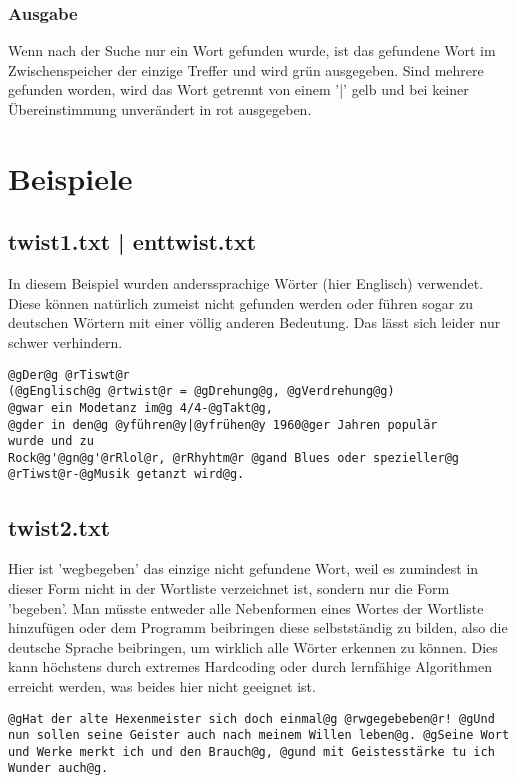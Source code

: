 \documentclass[a4paper,10pt,ngerman]{scrartcl}
\newcommand{\newsection}{\vspace{3\baselineskip}\section}
\newcommand{\newsubsubsection}{\vspace{1\baselineskip}\subsubsection}
\begin{document}
\newsubsubsection{Ausgabe}
Wenn nach der Suche nur ein Wort gefunden wurde, ist das gefundene Wort im Zwischenspeicher der einzige Treffer und wird grün ausgegeben. Sind mehrere gefunden worden, wird das Wort getrennt von einem '|' gelb und bei keiner Übereinstimmung unverändert in rot ausgegeben.



\pagebreak
\newsection{Beispiele}


\vspace{1\baselineskip}
\subsection[twist1.txt]{twist1.txt | enttwist.txt}
In diesem Beispiel wurden anderssprachige Wörter (hier Englisch) verwendet. Diese können natürlich zumeist nicht gefunden werden oder führen sogar zu deutschen Wörtern mit einer völlig anderen Bedeutung. Das lässt sich leider nur schwer verhindern.

\begin{lstlisting}
@gDer@g @rTiswt@r
(@gEnglisch@g @rtwist@r = @gDrehung@g, @gVerdrehung@g)
@gwar ein Modetanz im@g 4/4-@gTakt@g,
@gder in den@g @yführen@y|@yfrühen@y 1960@ger Jahren populär
wurde und zu
Rock@g'@gn@g'@rRlol@r, @rRhyhtm@r @gand Blues oder spezieller@g
@rTiwst@r-@gMusik getanzt wird@g.
\end{lstlisting}

\vspace{1\baselineskip}
\subsection{twist2.txt}
Hier ist 'wegbegeben' das einzige nicht gefundene Wort, weil es zumindest in dieser Form nicht in der Wortliste verzeichnet ist, sondern nur die Form 'begeben'. Man müsste entweder alle Nebenformen eines Wortes der Wortliste hinzufügen oder dem Programm beibringen diese selbstständig zu bilden, also die deutsche Sprache beibringen, um wirklich alle Wörter erkennen zu können. Dies kann höchstens durch extremes Hardcoding oder durch lernfähige Algorithmen erreicht werden, was beides hier nicht geeignet ist.

\begin{lstlisting}
@gHat der alte Hexenmeister sich doch einmal@g @rwgegebeben@r! @gUnd nun sollen seine Geister auch nach meinem Willen leben@g. @gSeine Wort und Werke merkt ich und den Brauch@g, @gund mit Geistesstärke tu ich Wunder auch@g.
\end{lstlisting}
\end{document}
